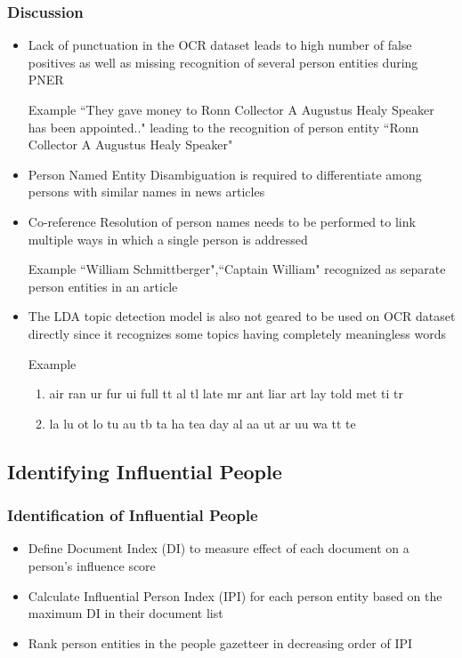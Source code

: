 \documentclass{beamer}
\begin{document}
\begin{frame}[allowframebreaks]
\frametitle{Discussion}
\begin{itemize}
\item
Lack of punctuation in the OCR dataset leads to high number of false positives as well as missing recognition of several person entities during PNER

\begin{block}{Example}
 ``They gave money to Ronn Collector A Augustus Healy Speaker has been appointed.." leading to the recognition of person entity ``Ronn Collector A Augustus Healy Speaker"
\end{block}	 
\item
Person Named Entity Disambiguation is required to differentiate among persons with similar names in news articles
\item

Co-reference Resolution of person names needs to be performed to link multiple ways in which a single person is addressed\\

\begin{block}{Example}
``William Schmittberger",``Captain William" recognized as separate person entities in an article
\end{block}
\item
The LDA topic detection model is also not geared to be used on OCR dataset directly since it recognizes some topics having completely meaningless words\\

\begin{block}{Example}
\begin{enumerate}
\item
 air ran ur fur ui full tt al tl late mr ant liar art lay told met ti tr\\
 \item
 la lu ot lo tu au tb ta ha tea day al aa ut ar uu wa tt te
\end{enumerate}
\end{block}
\end{itemize}
\end{frame}


\subsection{Identifying Influential People}
\begin{frame}
\frametitle{Identification of Influential People}
\begin{itemize}
\item
Define Document Index (DI) to measure effect of each document on a person's influence score
\item
Calculate Influential Person Index (IPI) for each person entity based on the maximum DI in their document list
\item
Rank person entities in the people gazetteer in decreasing order of IPI
\end{itemize}
\end{frame}
\end{document}
